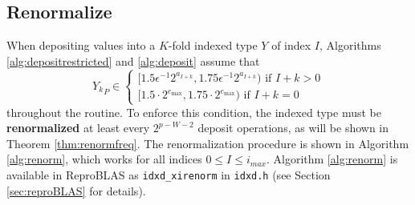 \subsection{Renormalize}
    \label{sec:primitiveops_renormalize}
    When depositing values into a $K$-fold indexed type $Y$ of index $I$,
    Algorithms \ref{alg:depositrestricted} and \ref{alg:deposit}
    assume that 
    \[
      {Y_k}_P \in \begin{cases}[1.5  \epsilon^{-1} 2^{a_{I + k}}, 1.75  \epsilon^{-1} 2^{a_{I + k}}) \text{ if } I + k > 0 \\ [1.5 \cdot 2^{e_{\max}}, 1.75 \cdot 2^{e_{\max}}) \text{ if } I + k = 0\end{cases}
    \] 
    throughout the routine.
    To enforce this condition, the indexed type must be \textbf{renormalized} at least
    every $2^{p-W-2}$ deposit operations, as will be shown in Theorem \ref{thm:renormfreq}.
    The renormalization procedure is shown in Algorithm \ref{alg:renorm},
    which works for all indices $0 \leq I \leq i_{max}$. Algorithm \ref{alg:renorm} is available in ReproBLAS as \texttt{idxd\_xirenorm} in \texttt{idxd.h} (see Section \ref{sec:reproBLAS} for details).

